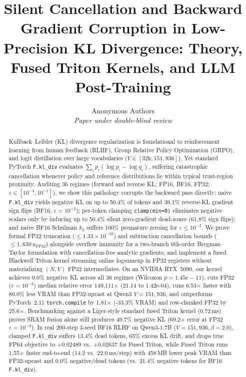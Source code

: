 \documentclass[10pt,twocolumn]{article}
\title{\Large\bfseries Silent Cancellation and Backward Gradient Corruption in Low-Precision KL Divergence: Theory, Fused Triton Kernels, and LLM Post-Training}
\author{Anonymous Authors \\ \textit{Paper under double-blind review}}
\date{}
\begin{document}
\maketitle
\begin{abstract}
Kullback--Leibler (KL) divergence regularization is foundational to reinforcement learning from human feedback (RLHF), Group Relative Policy Optimization (GRPO), and logit distillation over large vocabularies ($V \in [32\text{k}, 151{,}936]$). Yet standard PyTorch \texttt{F.kl\_div} evaluates $\sum_i p_i (\log p_i - \log q_i)$, suffering catastrophic cancellation whenever policy and reference distributions lie within typical trust-region proximity. Auditing 36 regimes (forward and reverse KL; FP16, BF16, FP32; $\varepsilon \in [10^{-4}, 10^{-1}]$), we show this pathology corrupts the backward pass directly: naive \texttt{F.kl\_div} yields negative KL on up to 50.4\% of tokens and 39.1\% reverse-KL gradient sign flips (BF16, $\varepsilon=10^{-2}$); per-token clamping \texttt{clamp(min=0)} eliminates negative scalars only by inducing up to 50.4\% silent zero-gradient dead-zones (61.8\% sign flips); and naive BF16 Schulman $k_3$ suffers 100\% premature zeroing for $\varepsilon \le 10^{-2}$. We prove formal FP32 truncation ($\le 1.33\times 10^{-10}$) and subtraction cancellation bounds ($\le 1{,}630\,u_{\mathrm{FP32}}$) alongside overflow immunity for a two-branch 6th-order Bregman--Taylor formulation with cancellation-free analytic gradients, and implement a fused Blackwell Triton kernel streaming online logsumexp in FP32 registers without materializing $(N,V)$ FP32 intermediates. On an NVIDIA RTX~5090, our kernel achieves 0.0\% negative KL across all 36 regimes (Wilcoxon $p=1.45e-11$), cuts FP32 ($\varepsilon=10^{-4}$) median relative error 149,111$\times$ (21.14 to 1.42e-04), runs 6.53$\times$ faster with 80.0\% less VRAM than FP32-upcast at Qwen3 $V=151{,}936$, and outperforms PyTorch~2.11 \texttt{torch.compile} by 1.81$\times$ (-33.3\% VRAM) and row-chunked FP32 by 25.6$\times$. Benchmarking against a Liger-style standard fused Triton kernel (0.72\,ms) proves SRAM fusion alone still produces 49.7\% negative KL (69.2$\times$ error at FP32 $\varepsilon=10^{-4}$). In real 200-step 3-seed BF16 RLHF on Qwen3-1.7B ($V=151{,}936, \beta=2.0$), clamped \texttt{F.kl\_div} suffers 13.4\% dead tokens, 65\% excess KL drift, and drops true FP64 objective to +0.02489 vs.\ +0.02637 for Fused Triton, while Fused Triton runs 1.55$\times$ faster end-to-end (14.2 vs.\ 22.0\,ms/step) with 458\,MB lower peak VRAM than FP32-upcast and 0.0\% negative/dead tokens (vs.\ 21.4\% negative tokens for BF16 \texttt{F.kl\_div}).
\end{abstract}
\end{document}

